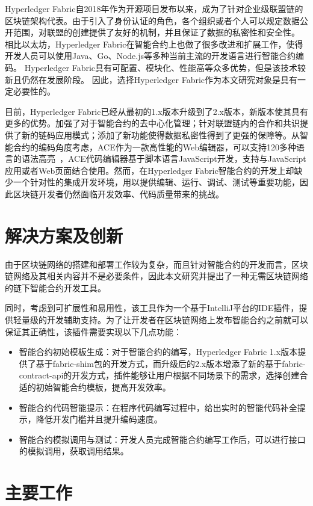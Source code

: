 Hyperledger Fabric自2018年作为开源项目发布以来，成为了针对企业级联盟链的区块链架构代表。由于引入了身份认证的角色，各个组织或者个人可以规定数据公开范围，对联盟的创建提供了友好的机制，并且保证了数据的私密性和安全性。
相比以太坊，Hyperledger Fabric在智能合约上也做了很多改进和扩展工作，使得开发人员可以使用Java、Go、Node.js等多种当前主流的开发语言进行智能合约编码。
Hyperledger Fabric具有可配置、模块化、性能高等众多优势，但是该技术较新且仍然在发展阶段。
因此，选择Hyperledger Fabric作为本文研究对象是具有一定必要性的。

目前，Hyperledger Fabric已经从最初的1.x版本升级到了2.x版本，新版本使其具有更多的优势。加强了对于智能合约的去中心化管理；针对联盟链内的合作和共识提供了新的链码应用模式；添加了新功能使得数据私密性得到了更强的保障等。从智能合约的编码角度考虑，ACE作为一款高性能的Web编辑器，可以支持120多种语言的语法高亮~\cite{罗雄2020}，ACE代码编辑器基于脚本语言JavaScript开发，支持与JavaScript应用或者Web页面结合使用。然而，在Hyperledger Fabric智能合约的开发上却缺少一个针对性的集成开发环境，用以提供编辑、运行、调试、测试等重要功能，因此区块链开发者仍然面临开发效率、代码质量带来的挑战。

\section{解决方案及创新}

由于区块链网络的搭建和部署工作较为复杂，而且针对智能合约的开发而言，区块链网络及其相关内容并不是必要条件，因此本文研究并提出了一种无需区块链网络的链下智能合约开发工具。

同时，考虑到可扩展性和易用性，该工具作为一个基于IntelliJ平台的IDE插件，提供轻量级的开发辅助支持。为了让开发者在区块链网络上发布智能合约之前就可以保证其正确性，该插件需要实现以下几点功能：

\begin{itemize}
    \item 智能合约初始模板生成：对于智能合约的编写，Hyperledger Fabric 1.x版本提供了基于fabric-shim包的开发方式，而升级后的2.x版本增添了新的基于fabric-contract-api的开发方式，插件能够让用户根据不同场景下的需求，选择创建合适的初始智能合约模板，提高开发效率。
    \item 智能合约代码智能提示：在程序代码编写过程中，给出实时的智能代码补全提示，降低开发门槛并且提升编码速度。
    \item 智能合约模拟调用与测试：开发人员完成智能合约编写工作后，可以进行接口的模拟调用，获取调用结果。
\end{itemize}

\section{主要工作}

